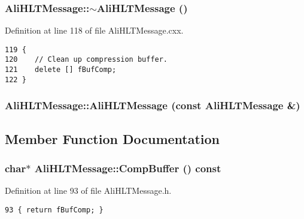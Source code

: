 \subsubsection{\setlength{\rightskip}{0pt plus 5cm}Ali\-HLTMessage::$\sim${\bf Ali\-HLTMessage} ()\hspace{0.3cm}{\tt  [virtual]}}\label{classAliHLTMessage_a2}




Definition at line 118 of file Ali\-HLTMessage.cxx.

\footnotesize\begin{verbatim}119 {
120    // Clean up compression buffer.
121    delete [] fBufComp;
122 }
\end{verbatim}\normalsize 


\subsubsection{\setlength{\rightskip}{0pt plus 5cm}Ali\-HLTMessage::Ali\-HLTMessage (const {\bf Ali\-HLTMessage} \&)\hspace{0.3cm}{\tt  [private]}}\label{classAliHLTMessage_d0}




\subsection{Member Function Documentation}
\subsubsection{\setlength{\rightskip}{0pt plus 5cm}char$\ast$ Ali\-HLTMessage::Comp\-Buffer () const\hspace{0.3cm}{\tt  [inline]}}\label{classAliHLTMessage_a14}




Definition at line 93 of file Ali\-HLTMessage.h.

\footnotesize\begin{verbatim}93 { return fBufComp; }
\end{verbatim}\normalsize 


